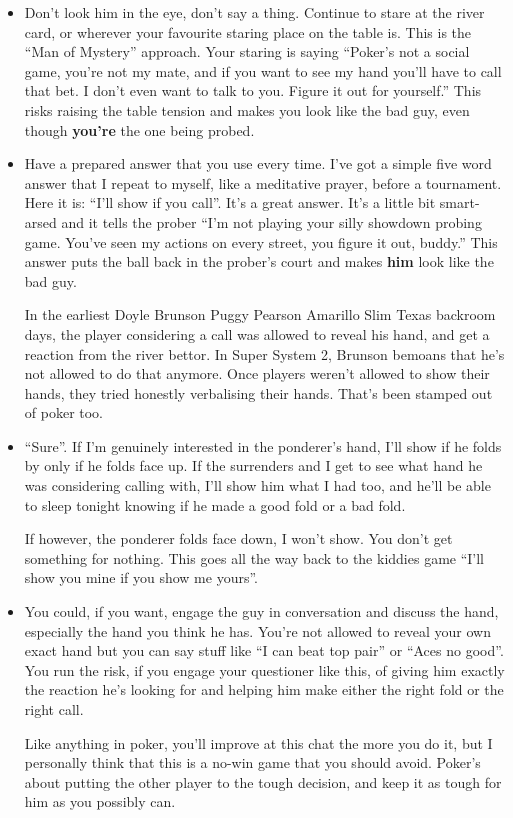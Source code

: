 \begin{itemize}
  \item Don't look him in the eye, don't say a thing. Continue to
    stare at the river card, or wherever your favourite staring place
    on the table is. This is the ``Man of Mystery'' approach. Your
    staring is saying ``Poker's not a social game, you're not my
    mate, and if you want to see my hand you'll have to call that
    bet. I don't even want to talk to you. Figure it out for
    yourself.'' This risks raising the table tension and makes you
    look like the bad guy, even though \textbf{you're} the one being
    probed.

  \item Have a prepared answer that you use every time. I've got a
    simple five word answer that I repeat to myself, like a meditative
    prayer, before a tournament. Here it is: ``I'll show if you
    call''. It's a great answer. It's a little bit smart-arsed and it
    tells the prober ``I'm not playing your silly showdown probing
    game. You've seen my actions on every street, you figure it out,
    buddy.'' This answer puts the ball back in the prober's court and
    makes \textbf{him} look like the bad guy.

  In the earliest Doyle Brunson Puggy Pearson Amarillo Slim Texas
  backroom days, the player considering a call was allowed to reveal
  his hand, and get a reaction from the river bettor. In Super System
  2, Brunson bemoans that he's not allowed to do that anymore.
  Once players weren't allowed to show their hands, they tried
  honestly verbalising their hands. That's been stamped out of poker
  too.

  \item ``Sure''. If I'm genuinely interested in the ponderer's hand,
    I'll show if he folds by only if he folds face up. If the
    surrenders and I get to see what hand he was considering calling
    with, I'll show him what I had too, and he'll be able to sleep
    tonight knowing if he made a good fold or a bad fold.

    If however, the ponderer folds face down, I won't show. You don't
    get something for nothing. This goes all the way back to the
    kiddies game ``I'll show you mine if you show me yours''.

  \item You could, if you want, engage the guy in conversation and
    discuss the hand, especially the hand you think he has. You're not
    allowed to reveal your own exact hand but you can say stuff like
    ``I can beat top pair'' or ``Aces no good''. You run the risk, if
    you engage your questioner like this, of giving him exactly the
    reaction he's looking for and helping him make either the right
    fold or the right call.

    Like anything in poker, you'll improve at this chat the more you
    do it, but I personally think that this is a no-win game that you
    should avoid. Poker's about putting the other player to the tough
    decision, and keep it as tough for him as you possibly can.
    
\end{itemize}

